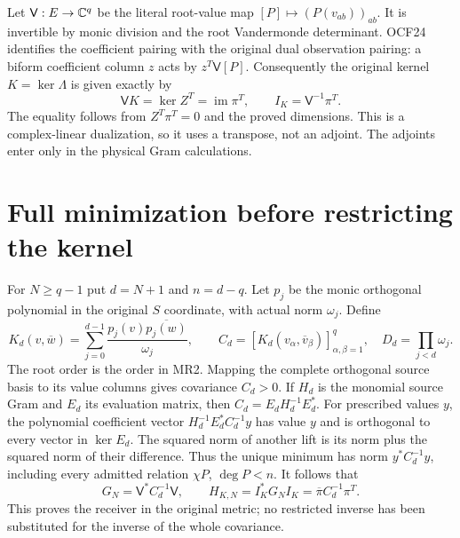 \documentclass[11pt]{article}
\begin{document}
Let $\mathsf V:E\to\mathbb C^q$ be the literal root-value map
$[P]\mapsto(P(v_{ab}))_{ab}$. It is invertible by monic division
and the root Vandermonde determinant. OCF24 identifies the coefficient
pairing with the original dual observation pairing: a biform coefficient
column $z$ acts by $z^T\mathsf V[P]$. Consequently the original kernel
$K=\ker\Lambda$ is given exactly by
\[
 \mathsf V K=\ker Z^T=\operatorname{im}\pi^T,
 \qquad I_K=\mathsf V^{-1}\pi^T.\tag{MR8}
\]
The equality follows from $Z^T\pi^T=0$ and the proved dimensions.
This is a complex-linear dualization, so it uses a transpose, not an
adjoint. The adjoints enter only in the physical Gram calculations.

\section{Full minimization before restricting the kernel}
For $N\ge q-1$ put $d=N+1$ and $n=d-q$. Let $p_j$ be the monic
orthogonal polynomial in the original $S$ coordinate, with actual norm
$\omega_j$. Define
\[
 K_d(v,\overline w)=\sum_{j=0}^{d-1}
       \frac{p_j(v)\overline{p_j(w)}}{\omega_j},
 \qquad C_d=[K_d(v_\alpha,\overline v_\beta)]_{\alpha,\beta=1}^q,
 \quad D_d=\prod_{j<d}\omega_j.\tag{MR9}
\]
The root order is the order in MR2. Mapping the complete orthogonal
source basis to its value columns gives covariance $C_d>0$.
If $H_d$ is the monomial source Gram and $E_d$ its evaluation matrix,
then $C_d=E_dH_d^{-1}E_d^*$. For prescribed values $y$, the polynomial
coefficient vector $H_d^{-1}E_d^*C_d^{-1}y$ has value $y$ and is
orthogonal to every vector in $\ker E_d$. The squared norm of another
lift is its norm plus the squared norm of their difference. Thus the
unique minimum has norm $y^*C_d^{-1}y$, including every admitted
relation $\chi P$, $\deg P<n$. It follows that
\[
 G_N=\mathsf V^*C_d^{-1}\mathsf V,
 \qquad H_{K,N}=I_K^*G_NI_K
           =\overline\pi C_d^{-1}\pi^T.\tag{MR10}
\]
This proves the receiver in the original metric; no restricted inverse
has been substituted for the inverse of the whole covariance.
\end{document}
